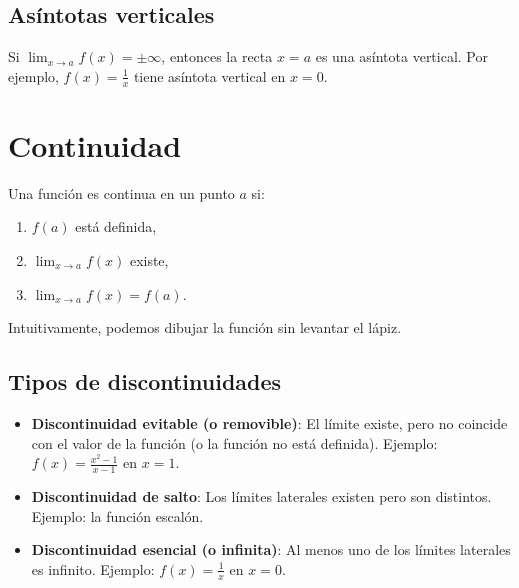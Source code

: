 \documentclass[12pt,a4paper,openany,oneside]{book}
\begin{document}
\subsection{Asíntotas verticales}
Si $\lim_{x \to a} f(x) = \pm \infty$, entonces la recta $x = a$ es una asíntota vertical. Por ejemplo, $f(x) = \frac{1}{x}$ tiene asíntota vertical en $x=0$.

\begin{center}
\end{center}

\section{Continuidad}

Una función es continua en un punto $a$ si:
\begin{enumerate}
    \item $f(a)$ está definida,
    \item $\lim_{x \to a} f(x)$ existe,
    \item $\lim_{x \to a} f(x) = f(a)$.
\end{enumerate}

Intuitivamente, podemos dibujar la función sin levantar el lápiz.

\subsection{Tipos de discontinuidades}
\begin{itemize}
    \item \textbf{Discontinuidad evitable (o removible)}: El límite existe, pero no coincide con el valor de la función (o la función no está definida). Ejemplo: $f(x)=\frac{x^2-1}{x-1}$ en $x=1$.
    \item \textbf{Discontinuidad de salto}: Los límites laterales existen pero son distintos. Ejemplo: la función escalón.
    \item \textbf{Discontinuidad esencial (o infinita)}: Al menos uno de los límites laterales es infinito. Ejemplo: $f(x)=\frac{1}{x}$ en $x=0$.
\end{itemize}
\end{document}
